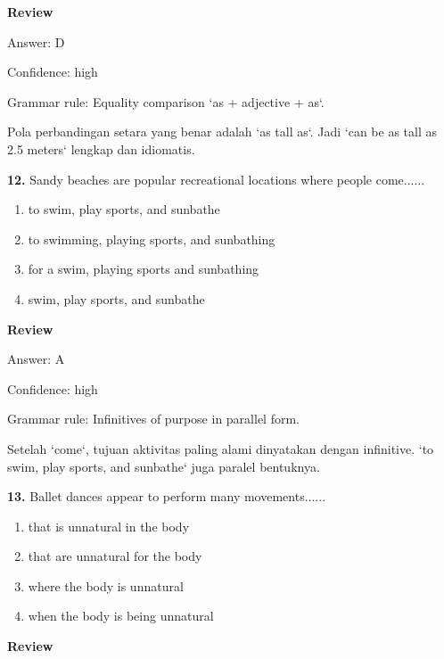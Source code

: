 \documentclass[12pt]{article}
\begin{document}
\par
\begingroup
\setlength{\parskip}{0pt}
\setlength{\parindent}{0pt}
\textbf{Review}\par
Answer: D\par
Confidence: high\par
Grammar rule: Equality comparison `as + adjective + as`.\par
Pola perbandingan setara yang benar adalah `as tall as`. Jadi `can be as tall as 2.5 meters` lengkap dan idiomatis.\par
\endgroup
\par
\vspace{0.25\baselineskip}
\noindent\textbf{12.} Sandy beaches are popular recreational locations where people come......
\begin{enumerate}[label=(\Alph*),leftmargin=*,itemsep=0.2em]
\item to swim, play sports, and sunbathe
\item to swimming, playing sports, and sunbathing
\item for a swim, playing sports and sunbathing
\item swim, play sports, and sunbathe
\end{enumerate}
\par
\begingroup
\setlength{\parskip}{0pt}
\setlength{\parindent}{0pt}
\textbf{Review}\par
Answer: A\par
Confidence: high\par
Grammar rule: Infinitives of purpose in parallel form.\par
Setelah `come`, tujuan aktivitas paling alami dinyatakan dengan infinitive. `to swim, play sports, and sunbathe` juga paralel bentuknya.\par
\endgroup
\par
\vspace{0.25\baselineskip}
\noindent\textbf{13.} Ballet dances appear to perform many movements......
\begin{enumerate}[label=(\Alph*),leftmargin=*,itemsep=0.2em]
\item that is unnatural in the body
\item that are unnatural for the body
\item where the body is unnatural
\item when the body is being unnatural
\end{enumerate}
\par
\begingroup
\setlength{\parskip}{0pt}
\setlength{\parindent}{0pt}
\textbf{Review}\par
\end{document}
